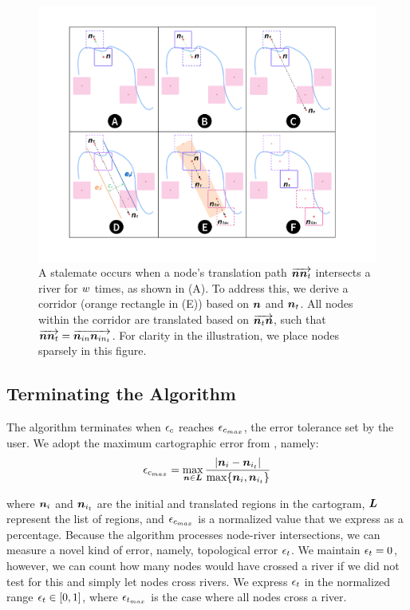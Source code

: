     {
        \begin{figure}[tb!]
            \centering
            \includegraphics[width=\columnwidth,keepaspectratio]{figure/corridor.png}
            \caption{A stalemate occurs when a node's translation path $ \protect\overrightarrow{\bm{n}\bm{n}_t} $ intersects a river for $ w $ times, as shown in (A). To address this, we derive a corridor (orange rectangle in (E)) based on $ \bm{n} $ and $ \bm{n}_t $. All nodes within the corridor are translated based on $ \protect\overrightarrow{\bm{n}_t\bm{n}} $, such that $ \protect\overrightarrow{\bm{n}\bm{n}_{t}} = \protect\overrightarrow{\bm{n}_{in}\bm{n}_{in_t}} $. For clarity in the illustration, we place nodes sparsely in this figure.}
            \label{fig:corridor}
        \end{figure}
    }


\subsection{Terminating the Algorithm}
\label{subsec:{Terminating the Algorithm}}

The algorithm terminates when $ \epsilon_{c} $ reaches $ \epsilon_{c_{max}} $, the error tolerance set by the user. We adopt the maximum cartographic error from \citet{alam2015Quantitative}, namely: $$ \epsilon_{c_{max}} = \max _{\bm{n} \in \bm{L}} \frac{|\bm{n}_i-\bm{n}_{i_t}|}{\max \{\bm{n}_i, \bm{n}_{i_t}\}}
$$

where $ \bm{n}_i $ and $ \bm{n}_{i_t} $ are the initial and translated regions in the cartogram, $ \bm{L} $ represent the list of regions, and $ \epsilon_{c_{max}} $ is a normalized value that we express as a percentage.
Because the algorithm processes node-river intersections, we can measure a novel kind of error, namely, topological error $ \epsilon_{t} $. We maintain $ \epsilon_{t} = 0 $, however, we can count how many nodes would have crossed a river if we did not test for this and simply let nodes cross rivers. We express $ \epsilon_{t} $ in the normalized range $ \epsilon_{t} \in [0,1] $, where $ \epsilon_{t_{max}} $ is the case where all nodes cross a river.

